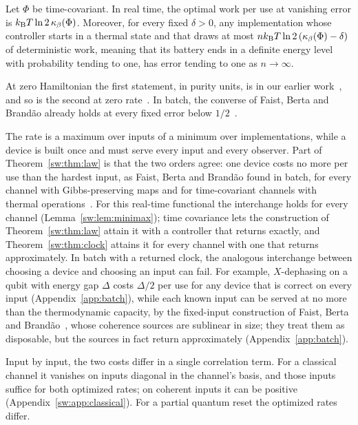 \begin{theorem}\label{sw:thm:law}
Let $\Phi$ be time-covariant. In real time, the optimal work per use at vanishing error is $k_{\mathrm B} T\ln 2\,\kappa_\beta(\Phi)$. Moreover, for every fixed $\delta>0$, any implementation whose controller starts in a thermal state and that draws at most $nk_{\mathrm B} T\ln 2\,(\kappa_\beta(\Phi)-\delta)$ of deterministic work, meaning that its battery ends in a definite energy level with probability tending to one, has error tending to one as $n\to\infty$.
\end{theorem}

At zero Hamiltonian the first statement, in purity units, is in our earlier work~\cite{Memory,ImmediateDelivery,Douglas26closed}, and so is the second at zero rate~\cite{Flagship}. In batch, the converse of Faist, Berta and Brand\~ao already holds at every fixed error below $1/2$~\cite[Prop.~4.2]{FBB21}.

The rate is a maximum over inputs of a minimum over implementations, while a device is built once and must serve every input and every observer. Part of Theorem~\ref{sw:thm:law} is that the two orders agree: one device costs no more per use than the hardest input, as Faist, Berta and Brand\~ao found in batch, for every channel with Gibbs-preserving maps and for time-covariant channels with thermal operations~\cite{FBB19,FBB21}. For this real-time functional the interchange holds for every channel (Lemma~\ref{sw:lem:minimax}); time covariance lets the construction of Theorem~\ref{sw:thm:law} attain it with a controller that returns exactly, and Theorem~\ref{sw:thm:clock} attains it for every channel with one that returns approximately. In batch with a returned clock, the analogous interchange between choosing a device and choosing an input can fail. For example, $X$-dephasing on a qubit with energy gap $\Delta$ costs $\Delta/2$ per use for any device that is correct on every input (Appendix~\ref{app:batch}), while each known input can be served at no more than the thermodynamic capacity, by the fixed-input construction of Faist, Berta and Brand\~ao~\cite[Prop.~8.3]{FBB21}, whose coherence sources are sublinear in size; they treat them as disposable, but the sources in fact return approximately (Appendix~\ref{app:batch}).

Input by input, the two costs differ in a single correlation term. For a classical channel it vanishes on inputs diagonal in the channel's basis, and those inputs suffice for both optimized rates; on coherent inputs it can be positive (Appendix~\ref{sw:app:classical}). For a partial quantum reset the optimized rates differ.

